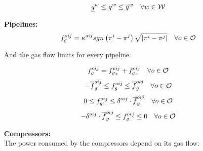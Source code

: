 \begin{equation}
\underline{g}^{w} \le g^{w} \le \overline{g}^{w} \quad \forall w \in \cal{W}
\label{g_limits}
\end{equation}

\textbf{Pipelines:} \\

\begin{equation}
{f}^{oij}_{g} = {{\kappa}^{oij}} sgn \left(\pi^{i}-\pi^{j}\right) {\sqrt{\left|\pi^{i}-\pi^{j}\right|}} \quad \forall o \in {\cal{O}}
\label{wey_eq}
\end{equation}

And the gas flow limits for every pipeline:

\begin{equation}
{f}^{oij}_{g} =  f^{oij}_{g_+} + {f}^{oij}_{g_-} \quad \forall o \in {\cal{O}}
\label{fgo}
\end{equation}
\begin{equation}
 - \overline{f}^{oij}_{g}  \le f^{oij}_{g} \le  \overline{f}^{oij}_{g}  \quad \forall o \in {\cal{O}}
\label{fgo_limits}
\end{equation}
\begin{equation}
0 \le f^{oij}_{g_+} \le \delta^{oij} \cdot \overline{f}^{oij}_{g} \quad \forall o \in {\cal{O}}
\label{fgopos_limits}
\end{equation}
\begin{equation}
- \delta^{oij} \cdot \overline{f}^{oij}_{g} \le f^{oij}_{g_-} \le 0 \quad \forall o \in {\cal{O}}
\label{fgoneg_limits}
\end{equation}



\textbf{Compressors:}\\

The power consumed by the compressors depend on its gas flow:\\

